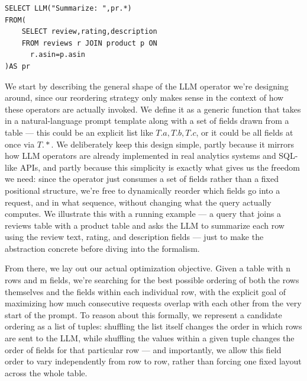\documentclass[manuscript,review]{acmart}
\begin{document}
\begin{tcolorbox}[colback=white, colframe=black, boxrule=0.6pt, arc=1pt, left=4pt, right=4pt, top=2pt, bottom=2pt]
\begin{lstlisting}[style=sqlstyle]
SELECT LLM("Summarize: ",pr.*)
FROM(
    SELECT review,rating,description
    FROM reviews r JOIN product p ON
      r.asin=p.asin         
)AS pr
\end{lstlisting}
\end{tcolorbox}

We start by describing the general shape of the LLM operator we're designing around, since our reordering strategy only makes sense in the context of how these operators are actually invoked. We define it as a generic function that takes in a natural-language prompt template along with a set of fields drawn from a table — this could be an explicit list like ${T.a, T.b, T.c}$, or it could be all fields at once via ${T.*}$. We deliberately keep this design simple, partly because it mirrors how LLM operators are already implemented in real analytics systems and SQL-like APIs, and partly because this simplicity is exactly what gives us the freedom we need: since the operator just consumes a set of fields rather than a fixed positional structure, we're free to dynamically reorder which fields go into a request, and in what sequence, without changing what the query actually computes. We illustrate this with a running example — a query that joins a reviews table with a product table and asks the LLM to summarize each row using the review text, rating, and description fields — just to make the abstraction concrete before diving into the formalism.

From there, we lay out our actual optimization objective. Given a table with n rows and m fields, we're searching for the best possible ordering of both the rows themselves and the fields within each individual row, with the explicit goal of maximizing how much consecutive requests overlap with each other from the very start of the prompt. To reason about this formally, we represent a candidate ordering as a list of tuples: shuffling the list itself changes the order in which rows are sent to the LLM, while shuffling the values within a given tuple changes the order of fields for that particular row — and importantly, we allow this field order to vary independently from row to row, rather than forcing one fixed layout across the whole table.
\end{document}

